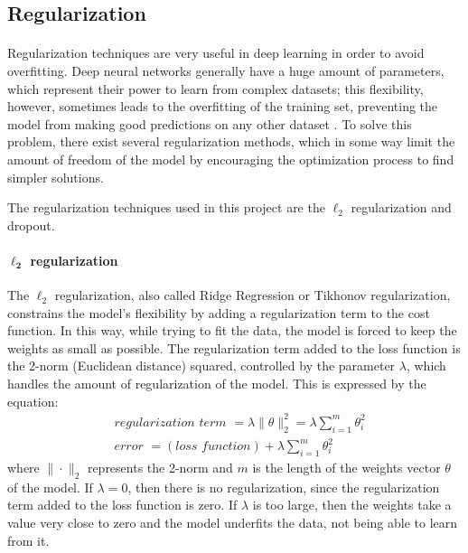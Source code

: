 \subsection{Regularization}
\paragraph{} Regularization techniques are very useful in deep learning in order to avoid overfitting. Deep neural networks generally have a huge amount of parameters, which represent their power to learn from complex datasets; this flexibility, however, sometimes leads to the overfitting of the training set, preventing the model from making good predictions on any other dataset \cite{OReilly:handsonML}. To solve this problem, there exist several regularization methods, which in some way limit the amount of freedom of the model by encouraging the optimization process to find simpler solutions.

The regularization techniques used in this project are the $\ell_{2}$ regularization and dropout.

\paragraph{$\mathbf{\ell_2}$ regularization} The $\ell_2$ regularization, also called Ridge Regression or Tikhonov regularization, constrains the model's flexibility by adding a regularization term to the cost function. In this way, while trying to fit the data, the model is forced to keep the weights as small as possible. The regularization term added to the loss function is the 2-norm (Euclidean distance) squared, controlled by the parameter $\lambda$, which handles the amount of regularization of the model. This is expressed by the equation:
\begin{align}
    &\textit{regularization term } = \lambda \|\theta\|_{2}^{2} = 
    \lambda \sum_{i=1}^{m} \theta_{i}^{2}\\
    &\textit{error } = (\textit{loss function}) + \lambda \sum_{i=1}^{m} \theta_{i}^{2}
\end{align}
where $\|\cdot\|_{2}$ represents the 2-norm and $m$ is the length of the weights vector $\theta$ of the model. If $\lambda = 0$, then there is no regularization, since the regularization term added to the loss function is zero. If $\lambda$ is too large, then the weights take a value very close to zero and the model underfits the data, not being able to learn from it.

